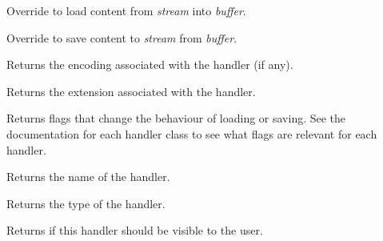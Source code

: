 Override to load content from {\it stream} into {\it buffer}.

\label{wxrichtextfilehandlerdosavefile}


Override to save content to {\it stream} from {\it buffer}.

\label{wxrichtextfilehandlergetencoding}


Returns the encoding associated with the handler (if any).

\label{wxrichtextfilehandlergetextension}


Returns the extension associated with the handler.

\label{wxrichtextfilehandlergetflags}


Returns flags that change the behaviour of loading or saving. See the documentation for each
handler class to see what flags are relevant for each handler.

\label{wxrichtextfilehandlergetname}


Returns the name of the handler.

\label{wxrichtextfilehandlergettype}


Returns the type of the handler.

\label{wxrichtextfilehandlerisvisible}


Returns \true if this handler should be visible to the user.

\label{wxrichtextfilehandlerloadfile}


